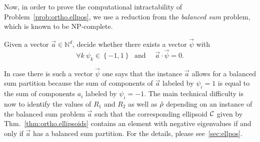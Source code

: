 Now, in order to prove the computational intractability of Problem~\ref{prob:ortho.ellpos}, we use a reduction from the \emph{balanced sum} problem, which is known to be NP-complete.
\begin{problem}\label{prob:ellpos.balanced_sum}
  Given a vector $\vec a \in \mathbb{N}^d$, decide whether there exists a vector $\vec \psi$ with
  \begin{equation}
    \forall{k}\:\psi_{k}\in\left\{ -1,1\right\} \;\textrm{ and }\quad \vec a \cdot \vec\psi=0.
    \label{eq:ellpos.partition_vector}
  \end{equation}
\end{problem}
In case there is such a vector $\vec \psi$ one says that the instance $\vec a$ allows for a balanced sum partition because the sum of components of $\vec a$ labeled by $\psi_i = 1$ is equal to the sum of components $a_i$ labeled by $\psi_i = -1$.
The main technical difficulty is now to identify the values of $R_1$ and $R_2$ as well as $\hat{\rho}$ depending on an instance of the balanced sum problem $\vec a$ such that the corresponding ellipsoid $\mathcal{C}$ given by Thm.~\ref{thm:ortho.ellipsoids} contains an element with negative eigenvalues if and only if $\vec a$ has a balanced sum partition.
For the details, please see~\ref{sec:ellpos}.

